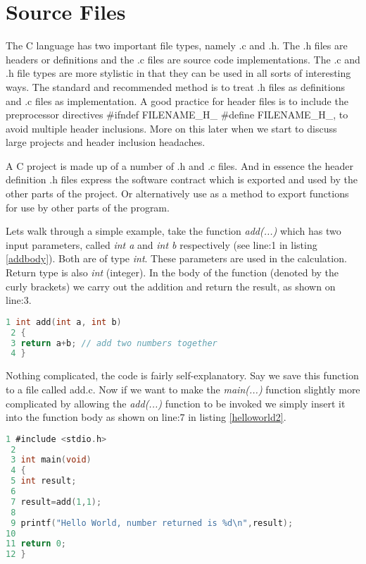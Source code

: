 \section{Source Files} \label{sourcefiles}

The C language has two important file types, namely .c and .h. The .h files are headers   or definitions and the .c files are source code implementations. The .c and .h file types are more stylistic in that they can be used in all sorts of interesting ways. The standard and recommended method is to treat .h files as definitions and .c files as implementation. A good practice for header files is to include the preprocessor directives \#ifndef FILENAME\_H\_ \#define FILENAME\_H\_, to avoid multiple header inclusions. More on this later when we start to discuss large projects and header inclusion headaches.

A C project is made up of a number of .h and .c files. And in essence the header definition .h files express the software contract which is exported and used by the other parts of the project. Or alternatively use as a method to export functions for use by other parts of the program.

Lets walk through a simple example, take the function \textit{add(...)} which has two input parameters, called \textit{int a} and \textit{int b} respectively (see line:1 in listing \ref{addbody}). Both are of type \textit{int}. These parameters are used in the calculation. Return type is also \textit{int} (integer). In the body of the function (denoted by the curly brackets) we carry out the addition and return the result, as shown on line:3.\\

\begin{lstlisting}[language=C,showstringspaces=false,caption={File add.c, add two integers},captionpos=b,label=addbody]
 1 int add(int a, int b)
 2 {
 3 return a+b; // add two numbers together
 4 }
\end{lstlisting}

Nothing complicated, the code is fairly self-explanatory. Say we save this function to a file called add.c. Now if we want to make the \textit{main(...)} function slightly more complicated by allowing the \textit{add(...)} function to be invoked we simply insert it into the function body as shown on line:7 in listing \ref{helloworld2}. 

\begin{lstlisting}[language=C,showstringspaces=false,caption={File hellow2.c, invokes add(...) function},captionpos=b,label=helloworld2]
 1 #include <stdio.h>
 2
 3 int main(void)
 4 {
 5 int result;
 6
 7 result=add(1,1);
 8
 9 printf("Hello World, number returned is %d\n",result);
10
11 return 0;
12 }
\end{lstlisting}


